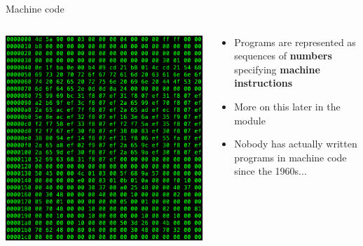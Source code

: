 \begin{frame}{Machine code}
	\begin{columns}
		\begin{column}{0.4\textwidth}
			\includegraphics[width=\textwidth]{machinecode}
		\end{column}
		\begin{column}{0.58\textwidth}
			\begin{itemize}
				\pause\item Programs are represented as sequences of \textbf{numbers}
					specifying \textbf{machine instructions}
				\pause\item More on this later in the module
				\pause\item Nobody has actually written programs in machine code since the 1960s...
			\end{itemize}
		\end{column}
	\end{columns}
\end{frame}

